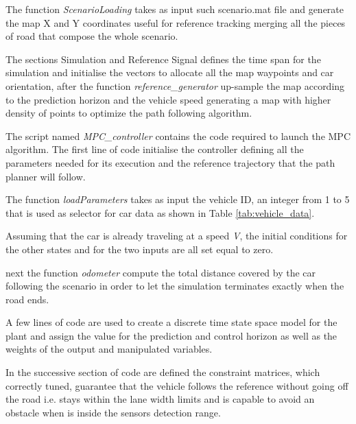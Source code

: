 The function \textit{ScenarioLoading} takes as input such scenario.mat file and generate the map X and Y coordinates useful for reference tracking merging all the pieces of road that compose the whole scenario.

The sections Simulation and Reference Signal defines the time span for the simulation and initialise the vectors to allocate all the map waypoints and car orientation, after the function \textit{reference\_generator} up-sample the map according to the prediction horizon and the vehicle speed generating a map with higher density of points to optimize the path following algorithm.









The script named \textit{MPC\_controller} contains the code required to launch the MPC algorithm.
The first line of code initialise the controller defining all the parameters needed for its execution and the reference trajectory that the path planner will follow.

The function \textit{loadParameters} takes as input the vehicle ID, an integer from 1 to 5 that is used as selector for car data as shown in Table \ref{tab:vehicle_data}.

Assuming that the car is already traveling at a speed \textit{V}, the initial conditions for the other states and for the two inputs are all set equal to zero.


next the function \textit{odometer} compute the total distance covered by the car following the scenario in order to let the simulation terminates exactly when the road ends.

A few lines of code are used to create a discrete time state space model for the plant and assign the value for the prediction and control horizon as well as the weights of the output and manipulated variables.

In the successive section of code are defined the constraint matrices, which correctly tuned, guarantee that the vehicle follows the reference without going off the road  i.e. stays within the lane width limits and is capable to avoid an obstacle when is inside the sensors detection range.




